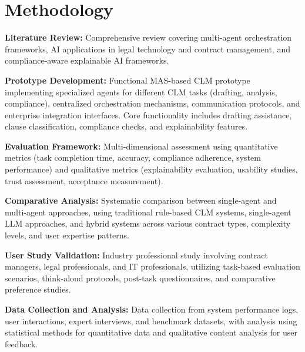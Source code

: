 
\section{Methodology}\label{section:methodology}

\textbf{Literature Review:} Comprehensive review covering multi-agent orchestration frameworks, AI applications in legal technology and contract management, and compliance-aware explainable AI frameworks.

\textbf{Prototype Development:} Functional MAS-based CLM prototype implementing specialized agents for different CLM tasks (drafting, analysis, compliance), centralized orchestration mechanisms, communication protocols, and enterprise integration interfaces. Core functionality includes drafting assistance, clause classification, compliance checks, and explainability features.

\textbf{Evaluation Framework:} Multi-dimensional assessment using quantitative metrics (task completion time, accuracy, compliance adherence, system performance) and qualitative metrics (explainability evaluation, usability studies, trust assessment, acceptance measurement).

\textbf{Comparative Analysis:} Systematic comparison between single-agent and multi-agent approaches, using traditional rule-based CLM systems, single-agent LLM approaches, and hybrid systems across various contract types, complexity levels, and user expertise patterns.

\textbf{User Study Validation:} Industry professional study involving contract managers, legal professionals, and IT professionals, utilizing task-based evaluation scenarios, think-aloud protocols, post-task questionnaires, and comparative preference studies.

\textbf{Data Collection and Analysis:} Data collection from system performance logs, user interactions, expert interviews, and benchmark datasets, with analysis using statistical methods for quantitative data and qualitative content analysis for user feedback.
